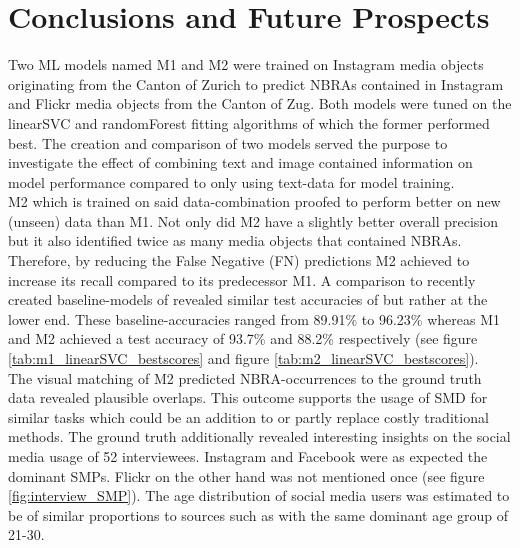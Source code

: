 \chapter{Conclusions and Future Prospects} \label{conclusion_outlook}

Two ML models named M1 and M2 were trained on Instagram media objects originating from the Canton of Zurich to predict NBRAs contained in Instagram and Flickr media objects from the Canton of Zug. Both models were tuned on the linearSVC and randomForest fitting algorithms of which the former performed best. The creation and comparison of two models served the purpose to investigate the effect of combining text and image contained information on model performance compared to only using text-data for model training.\\
M2 which is trained on said data-combination proofed to perform better on new (unseen) data than M1. Not only did M2 have a slightly better overall precision but it also identified twice as many media objects that contained NBRAs. Therefore, by reducing the False Negative (FN) predictions M2 achieved to increase its recall compared to its predecessor M1. A comparison to recently created baseline-models of \parencite{Das2018, Li2018} revealed similar test accuracies of but rather at the lower end. These baseline-accuracies ranged from 89.91\% to 96.23\% whereas M1 and M2 achieved a test accuracy of 93.7\% and 88.2\% respectively (see figure \ref{tab:m1_linearSVC_bestscores} and figure \ref{tab:m2_linearSVC_bestscores}).\\
The visual matching of M2 predicted NBRA-occurrences to the ground truth data revealed plausible overlaps. This outcome supports the usage of SMD for similar tasks which could be an addition to or partly replace costly traditional methods. The ground truth additionally revealed interesting insights on the social media usage of 52 interviewees. Instagram and Facebook were as expected the dominant SMPs. Flickr on the other hand was not mentioned once (see figure \ref{fig:interview_SMP}). The age distribution of social media users was estimated to be of similar proportions  to sources such as \parencite{2013} with the same dominant age group of 21-30.

